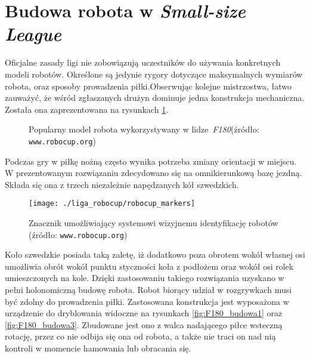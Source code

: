 \section{Budowa robota \label{sec:budowa_robota} w \emph{Small-size League}}
	Oficjalne zasady ligi nie zobowiązują uczestników do używania konkretnych modeli robotów. Określone są jedynie rygory dotyczące maksymalnych wymiarów robota,
	oraz sposoby prowadzenia piłki.Obserwując kolejne mistrzostwa, łatwo zauważyć, że wśród zgłaszanych drużyn dominuje jedna konstrukcja mechaniczna.
	Została ona zaprezentowana na  rysunkach \ref{fig:F180_budowa}.
 	\begin{figure}
	\centering
	\caption{Popularny model robota wykorzystywany w \mbox{lidze \emph{F180}}\newline(źródło: \texttt{www.robocup.org}) }
	\label{fig:F180_budowa}
	\end{figure}
	Podczas gry w piłkę nożną często wynika potrzeba zmiany orientacji w miejscu. W prezentowanym rozwiązaniu
	zdecydowano się na omnikierunkową bazę jezdną. Składa się ona z trzech niezależnie napędzanych kół szwedzkich.
	\begin{wrapfigure}{r}{0.42\textwidth}
	\vspace{-10pt}
	\begin{center}	
	\texttt{[image: ./liga\_robocup/robocup\_markers]}
	\end{center}
	\caption{Znacznik umożliwiający systemowi wizyjnemu identyfikację robotów \newline(źródło: \texttt{www.robocup.org})\label{fig:znacznik}}
	\vspace{-40pt}
	\end{wrapfigure}
	Koło szwedzkie posiada taką zaletę, iż dodatkowo poza obrotem wokół własnej osi umożliwia obrót
	wokół punktu styczności koła z podłożem oraz wokół osi rolek umieszczonych na kole.
	Dzięki zastosowaniu takiego rozwiązania uzyskano w pełni holonomiczną budowę robota.
	Robot biorący udział w rozgrywkach musi być zdolny do prowadzenia piłki. Zastosowana konstrukcja jest wyposażona w urządzenie do dryblowania widoczne na rysunkach \ref{fig:F180_budowa1} oraz \ref{fig:F180_budowa3}. 
	Zbudowane jest ono z walca nadającego piłce wsteczną rotację, przez co nie odbija się ona od robota, a także nie traci on nad nią kontroli w momencie hamowania lub obracania się.
	
